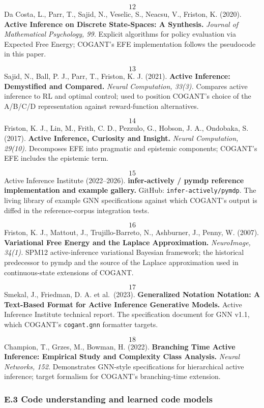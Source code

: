 \documentclass[
]{article}
\begin{document}
\[12\] Da Costa, L., Parr, T., Sajid, N., Veselic, S., Neacsu, V.,
Friston, K. (2020). \textbf{Active Inference on Discrete State-Spaces: A
Synthesis.} \emph{Journal of Mathematical Psychology, 99.} Explicit
algorithms for policy evaluation via Expected Free Energy; COGANT's EFE
implementation follows the pseudocode in this paper.

\[13\] Sajid, N., Ball, P. J., Parr, T., Friston, K. J. (2021).
\textbf{Active Inference: Demystified and Compared.} \emph{Neural
Computation, 33(3).} Compares active inference to RL and optimal
control; used to position COGANT's choice of the A/B/C/D representation
against reward-function alternatives.

\[14\] Friston, K. J., Lin, M., Frith, C. D., Pezzulo, G., Hobson, J.
A., Ondobaka, S. (2017). \textbf{Active Inference, Curiosity and
Insight.} \emph{Neural Computation, 29(10).} Decomposes EFE into
pragmatic and epistemic components; COGANT's EFE includes the epistemic
term.

\[15\] Active Inference Institute (2022--2026). \textbf{infer-actively
/ pymdp reference implementation and example gallery.} GitHub:
\texttt{infer-actively/pymdp}. The living library of example GNN
specifications against which COGANT's output is diffed in the
reference-corpus integration tests.

\[16\] Friston, K. J., Mattout, J., Trujillo-Barreto, N., Ashburner,
J., Penny, W. (2007). \textbf{Variational Free Energy and the Laplace
Approximation.} \emph{NeuroImage, 34(1).} SPM12 active-inference
variational Bayesian framework; the historical predecessor to pymdp and
the source of the Laplace approximation used in continuous-state
extensions of COGANT.

\[17\] Smekal, J., Friedman, D. A. et al.~(2023). \textbf{Generalized
Notation Notation: A Text-Based Format for Active Inference Generative
Models.} Active Inference Institute technical report. The specification
document for GNN v1.1, which COGANT's \texttt{cogant.gnn} formatter
targets.

\[18\] Champion, T., Grzes, M., Bowman, H. (2022). \textbf{Branching
Time Active Inference: Empirical Study and Complexity Class Analysis.}
\emph{Neural Networks, 152.} Demonstrates GNN-style specifications for
hierarchical active inference; target formalism for COGANT's
branching-time extension.

\subsubsection{E.3 Code understanding and learned code
models}\label{e.3-code-understanding-and-learned-code-models}
\end{document}
